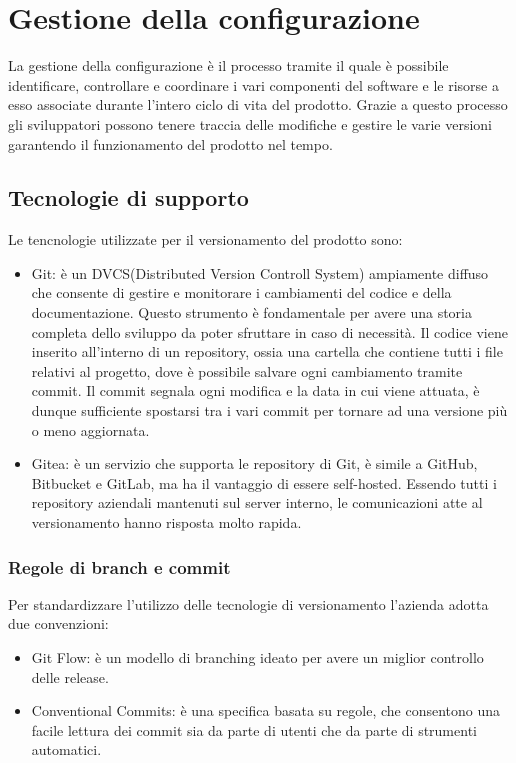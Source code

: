 \section{Gestione della configurazione}
La gestione della configurazione è il processo tramite il quale è possibile identificare, controllare e coordinare i vari componenti del software e le risorse a esso associate durante l'intero ciclo di vita del prodotto. Grazie a questo processo gli sviluppatori possono tenere traccia delle modifiche e gestire le varie versioni garantendo il funzionamento del prodotto nel tempo.

\subsection{Tecnologie di supporto}
Le tencnologie utilizzate per il versionamento del prodotto sono:
\begin{itemize}
    \item Git: è un DVCS(Distributed Version Controll System) ampiamente diffuso che consente di gestire e monitorare i cambiamenti del codice e della documentazione. Questo strumento è fondamentale per avere una storia completa dello sviluppo da poter sfruttare in caso di necessità. Il codice viene inserito all'interno di un repository, ossia una cartella che contiene tutti i file relativi al progetto, dove è possibile salvare ogni cambiamento tramite commit. Il commit segnala ogni modifica e la data in cui viene attuata, è dunque sufficiente spostarsi tra i vari commit per tornare ad una versione più o meno aggiornata.    
    \item Gitea: è un servizio che supporta le repository di Git, è simile a GitHub, Bitbucket e GitLab, ma ha il vantaggio di essere self-hosted. 
    Essendo tutti i repository aziendali mantenuti sul server interno, le comunicazioni atte al versionamento hanno risposta molto rapida.
\end{itemize}

\subsubsection{Regole di branch e commit}
Per standardizzare l'utilizzo delle tecnologie di versionamento l'azienda adotta due convenzioni:
\begin{itemize}
    \item Git Flow: è un modello di branching ideato per avere un miglior controllo delle release.
    \item Conventional Commits: è una specifica basata su regole, che consentono una facile lettura dei commit sia da parte di utenti che da parte di strumenti automatici. 
\end{itemize}





